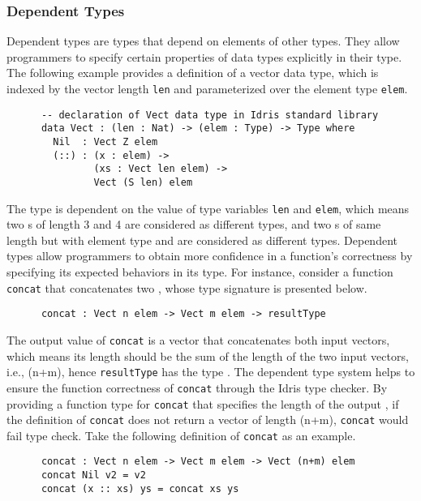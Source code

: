 \subsubsection*{Dependent Types}
Dependent types are types that depend on elements of other types\cite{Bove}. They allow programmers to specify certain properties of data types explicitly in their type. The following example provides a definition of a vector data type, which is indexed by the vector length \texttt{len} and parameterized over the element type \texttt{elem}.
\begin{lstlisting}
      -- declaration of Vect data type in Idris standard library
      data Vect : (len : Nat) -> (elem : Type) -> Type where
        Nil  : Vect Z elem
        (::) : (x : elem) -> 
               (xs : Vect len elem) -> 
               Vect (S len) elem
\end{lstlisting}

The type  is dependent on the value of type variables \texttt{len} and \texttt{elem}, which means two s of length 3 and 4 are considered as different types, and two s of same length but with element type  and  are considered as different types. Dependent types allow programmers to obtain more confidence in a function's correctness by specifying its expected behaviors in its type. For instance, consider a function \texttt{concat} that concatenates two , whose type signature is presented below. 
\begin{lstlisting}
      concat : Vect n elem -> Vect m elem -> resultType
\end{lstlisting}

The output value of \texttt{concat} is a vector that concatenates both input vectors, which means its length should be the sum of the length of the two input vectors, i.e., (n+m), hence \texttt{resultType} has the type . The dependent type system helps to ensure the function correctness of \texttt{concat} through the Idris type checker. By providing a function type for \texttt{concat} that specifies the length of the output , if the definition of \texttt{concat} does not return a vector of length (n+m), \texttt{concat} would fail type check. Take the following definition of \texttt{concat} as an example. 
\begin{lstlisting}
      concat : Vect n elem -> Vect m elem -> Vect (n+m) elem
      concat Nil v2 = v2
      concat (x :: xs) ys = concat xs ys
\end{lstlisting}

